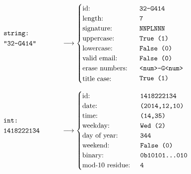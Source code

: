 \newenvironment{stackedlines}{\renewcommand{\arraystretch}{1.2}\begin{array}[b]{@{}l@{\quad}l@{}}}{\end{array}}

\begin{figure}[H]
  $\begin{stackedlines}
    \texttt{string:}\\
    \texttt{\parbox{\widthof{1418222134.325}}{"32-G414"}}
  \end{stackedlines} \longrightarrow
  \begin{cases}
    \text{id: } & \texttt{32-G414}\\
    \text{length: } & \texttt{7}\\
    \text{signature: } & \texttt{NNPLNNN}\\
    \text{uppercase: } & \texttt{True (1)}\\
    \text{lowercase: } & \texttt{False (0)}\\
    \text{valid email: } & \texttt{False (0)}\\
    \text{erase numbers: } & \texttt{<num>-G<num>}\\
    \text{\parbox{\widthof{base-10 residue:}}{title case:} } & \texttt{True (1)}
  \end{cases}$
\end{figure}

\begin{figure}[H]
  $\begin{stackedlines}
    \texttt{int:}\\
    \texttt{\parbox{\widthof{1418222134.325}}{1418222134}}
  \end{stackedlines} \longrightarrow
  \begin{cases}
    \text{id: } & \texttt{1418222134}\\
    \text{date: } & \texttt{(2014,12,10)}\\
    \text{time: } & \texttt{(14,35)}\\
    \text{weekday: } & \texttt{Wed (2)}\\
    \text{day of year: } & \texttt{344}\\
    \text{weekend: } & \texttt{False (0)}\\
    \text{binary: } & \texttt{0b10101\ldots010}\\
    \text{mod-10 residue: } & \texttt{4}
  \end{cases}$
\end{figure}

